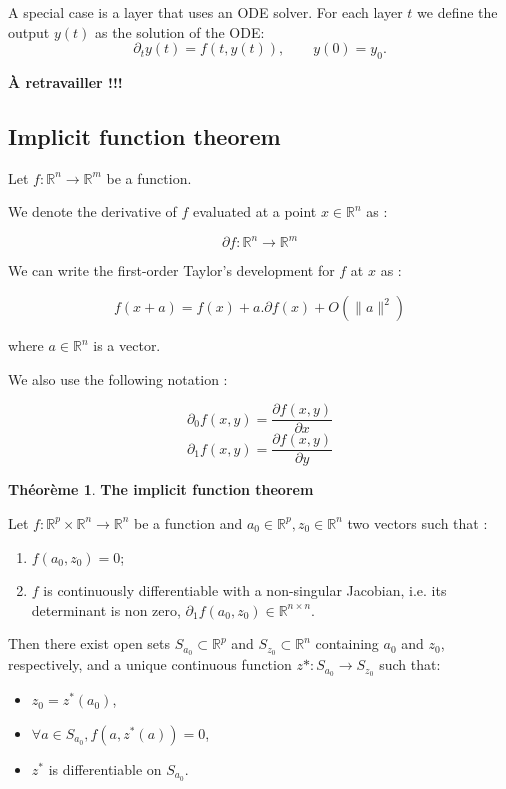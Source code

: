 \documentclass[10pt,a4paper]{article}
\theoremstyle{definition}
\theoremstyle{theorem}
\newtheorem{theorem}{Théorème}
\begin{document}
A special case is a layer that uses an ODE solver. For each layer $t$ we define the output $y(t)$ as the solution of the ODE:
$$\partial_t y(t) = f(t, y(t)), \qquad y(0) = y_0.$$

\textbf{À retravailler !!!}

\subsection{Implicit function theorem}
Let $f: \mathbb{R}^n \rightarrow \mathbb{R}^m$ be a function.

We denote the derivative of $f$ evaluated at a point $x \in \mathbb{R}^n$ as :

\[ \partial f : \mathbb{R}^n \rightarrow \mathbb{R}^m \]

We can write the first-order Taylor's development for $f$ at $x$ as :

\[ f(x + a) = f(x) + a . \partial f(x) + O(\| a\|^2) \]


where $a \in \mathbb{R}^n$ is a vector.

We also use the following notation :

\[ \partial_0 f(x,y) = \frac{\partial f(x,y)}{\partial x}  \]
\[ \partial_1 f(x,y) = \frac{\partial f(x,y)}{\partial y}  \]

\begin{theorem}{\textbf{The implicit function theorem}}

Let $f: \mathbb{R}^p \times \mathbb{R}^n \rightarrow \mathbb{R}^n$ be a function and $a_0 \in \mathbb{R}^p , z_0 \in \mathbb{R}^n$ two vectors such that :

\begin{enumerate}
\item $f(a_0,z_0) = 0$;
\item $f$ is continuously differentiable with a non-singular Jacobian, i.e. its determinant is non zero, $\partial_1 f(a_0,z_0) \in \mathbb{R}^{n \times n}$.
\end{enumerate}
Then there exist open sets $S_{a_0} \subset \mathbb{R}^p$ and $S_{z_0} \subset \mathbb{R}^n$ containing $a_0$ and $z_0$, respectively, and a unique continuous function $z*:S_{a_0} \rightarrow S_{z_0}$ such that:
\begin{itemize}
\item $z_0=z^*(a_0)$,
\item $ \forall a \in S_{a_0}, f(a,z^*(a))=0$,
\item $z^*$ is differentiable on $S_{a_0}$.
\end{itemize}
\end{theorem}
\end{document}
